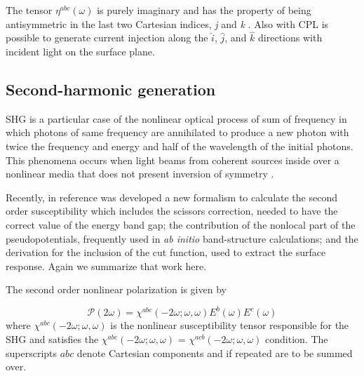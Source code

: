 \documentclass[pss]{wiley2sp} %
\begin{document}
\begin{changed}
The tensor $\eta^{abc}(\omega)$ is purely imaginary and has the property of being antisymmetric in the last two Cartesian indices, \emph{j} and \emph{k} \cite{sipe2000second,nastos2006optical}. Also with CPL is possible to generate current injection along the $\hat{i}$, $\hat{j}$, and $\hat{k}$ directions with incident light on the surface plane.


\end{changed}


\subsection{Second-harmonic generation}

SHG is a particular case of the nonlinear optical process of sum of frequency in which photons of same frequency are annihilated to produce a new photon with twice the frequency and energy and half of the wavelength of the initial photons. This phenomena occurs when light beams from coherent sources inside over a nonlinear media that does not present inversion of symmetry \cite{bloembergen1962light,andersonPRB15,sipe2000second}.

Recently, in reference \cite{andersonPRB15} was developed a new formalism to calculate the second order susceptibility which includes the scissors correction, needed to have the correct value of the energy band gap; the contribution of the nonlocal part of the pseudopotentials, frequently used in \emph{ab initio} band-structure calculations; and the derivation for the inclusion of the cut function, used to extract the surface response. Again we summarize that work here.

The second order nonlinear polarization is given by 

\begin{equation*}
\mathcal{P}(2\omega) = \chi^{abc}(-2\omega;\omega,\omega)E^{b}(\omega)E^{c}(\omega)
\end{equation*}
where $\chi^{abc}(-2\omega;\omega,\omega)$ is the nonlinear susceptibility tensor responsible for the SHG and satisfies the $\chi^{abc}(-2\omega;\omega,\omega)$ = $\chi^{acb}(-2\omega;\omega,\omega)$ condition. The superscripts $abc$ denote Cartesian components and if repeated are to be summed over. 
\end{document}
